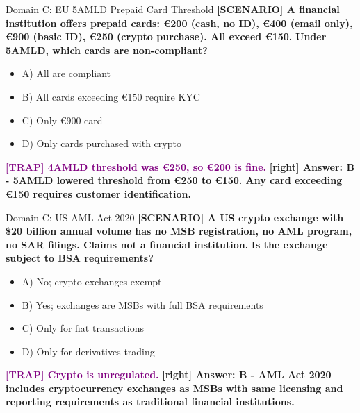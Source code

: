 \documentclass[11pt,a4paper]{beamer}
\newcommand{\trap}[1]{\textcolor{purple}{\textbf{[TRAP] #1}}}
\newcommand{\correct}[1]{\textcolor{green!50!black}{\textbf{[right] #1}}}
\newcommand{\scenario}[1]{\textcolor{blue!70!black}{\textbf{[SCENARIO] #1}}}
\begin{document}
\begin{frame}{Domain C: EU 5AMLD Prepaid Card Threshold}
\scenario{A financial institution offers prepaid cards: €200 (cash, no ID), €400 (email only), €900 (basic ID), €250 (crypto purchase). All exceed €150.}
\vspace{0.2cm}
\textbf{Under 5AMLD, which cards are non-compliant?}
\vspace{0.2cm}
\begin{itemize}
    \item A) All are compliant
    \item B) All cards exceeding €150 require KYC
    \item C) Only €900 card
    \item D) Only cards purchased with crypto
\end{itemize}
\vspace{0.2cm}
\trap{4AMLD threshold was €250, so €200 is fine.}
\correct{Answer: B - 5AMLD lowered threshold from €250 to €150. Any card exceeding €150 requires customer identification.}
\end{frame}

\begin{frame}{Domain C: US AML Act 2020}
\scenario{A US crypto exchange with \$20 billion annual volume has no MSB registration, no AML program, no SAR filings. Claims not a financial institution.}
\vspace{0.2cm}
\textbf{Is the exchange subject to BSA requirements?}
\vspace{0.2cm}
\begin{itemize}
    \item A) No; crypto exchanges exempt
    \item B) Yes; exchanges are MSBs with full BSA requirements
    \item C) Only for fiat transactions
    \item D) Only for derivatives trading
\end{itemize}
\vspace{0.2cm}
\trap{Crypto is unregulated.}
\correct{Answer: B - AML Act 2020 includes cryptocurrency exchanges as MSBs with same licensing and reporting requirements as traditional financial institutions.}
\end{frame}
\end{document}
